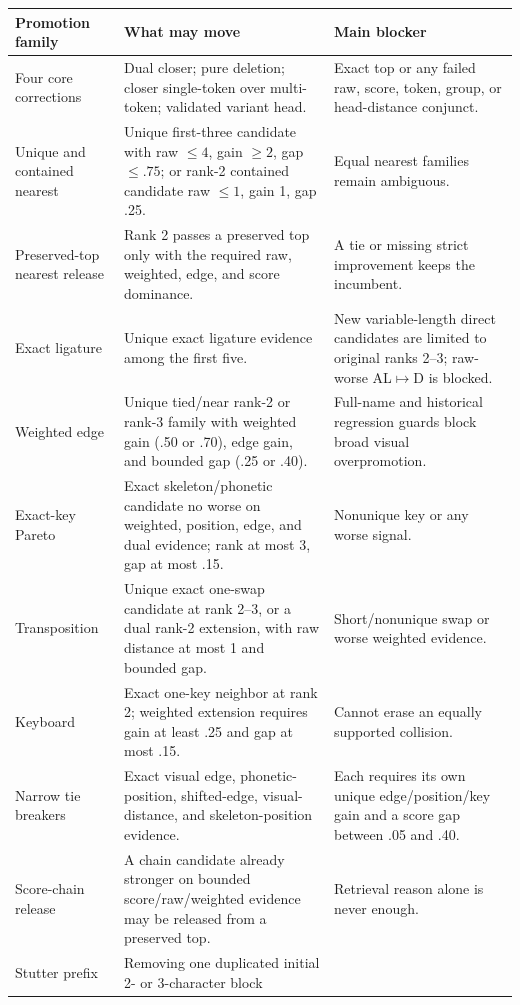 \documentclass[10pt,a4paper]{article}
\begin{document}
\begin{longtable}{@{}L{38mm}L{74mm}L{54mm}@{}}
\toprule
Promotion family & What may move & Main blocker \\
\midrule
\endhead
Four core corrections & Dual closer; pure deletion; closer single-token over
multi-token; validated variant head. & Exact top or any failed raw, score,
token, group, or head-distance conjunct. \\
Unique and contained nearest & Unique first-three candidate with raw
$\leq4$, gain $\geq2$, gap $\leq.75$; or rank-2 contained candidate raw
$\leq1$, gain 1, gap .25. & Equal nearest families remain ambiguous. \\
Preserved-top nearest release & Rank 2 passes a preserved top only with the
required raw, weighted, edge, and score dominance. & A tie or missing strict
improvement keeps the incumbent. \\
Exact ligature & Unique exact ligature evidence among the first five. & New
variable-length direct candidates are limited to original ranks 2--3;
raw-worse AL$\mapsto$D is blocked. \\
Weighted edge & Unique tied/near rank-2 or rank-3 family with weighted gain
(.50 or .70), edge gain, and bounded gap (.25 or .40). & Full-name and
historical regression guards block broad visual overpromotion. \\
Exact-key Pareto & Exact skeleton/phonetic candidate no worse on weighted,
position, edge, and dual evidence; rank at most 3, gap at most .15. & Nonunique
key or any worse signal. \\
Transposition & Unique exact one-swap candidate at rank 2--3, or a dual rank-2
extension, with raw distance at most 1 and bounded gap. & Short/nonunique swap
or worse weighted evidence. \\
Keyboard & Exact one-key neighbor at rank 2; weighted extension requires gain
at least .25 and gap at most .15. & Cannot erase an equally supported collision. \\
Narrow tie breakers & Exact visual edge, phonetic-position, shifted-edge,
visual-distance, and skeleton-position evidence. & Each requires its own
unique edge/position/key gain and a score gap between .05 and .40. \\
Score-chain release & A chain candidate already stronger on bounded
score/raw/weighted evidence may be released from a preserved top. & Retrieval
reason alone is never enough. \\
Stutter prefix & Removing one duplicated initial 2- or 3-character block

\end{longtable}
\end{document}
